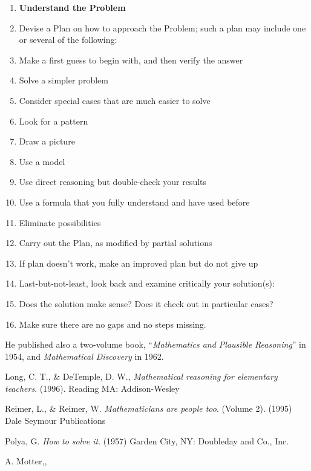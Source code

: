 \documentclass[12pt]{article}
\theoremstyle{plain}
\theoremstyle{definition}
\numberwithin{equation}{section}
\begin{document}
\begin{enumerate}
\item \textbf{Understand the Problem}
\item Devise a Plan on how to approach the Problem; such a plan may include one or several of the following:
\item Make a first guess to begin with, and then verify the answer
\item Solve a simpler problem
\item Consider special cases that are much easier to solve
\item Look for a pattern
\item Draw a picture
\item Use a model  
\item Use direct reasoning but double-check your results
\item Use a formula that you fully understand and have used before
\item Eliminate possibilities
\item Carry out the Plan, as modified by partial solutions
\item If plan doesn't work, make an improved plan but do not give up
\item Last-but-not-least, look back and examine critically your solution(s):
\item Does the solution make sense? Does it check out in particular cases?
\item Make sure there are no gaps and no steps missing.
\end{enumerate}

He published also a two-volume book, ``{\em Mathematics and Plausible Reasoning}'' in 1954, and 
{\em Mathematical Discovery} in 1962.


\begin{thebibliography}{9}
Long, C. T., \& DeTemple, D. W., {\em Mathematical reasoning for elementary teachers}. (1996). Reading MA: Addison-Wesley 

\bibitem{}
Reimer, L., \& Reimer, W. {\em Mathematicians are people too}. (Volume 2). (1995) Dale Seymour Publications 

Polya, G. {\em How to solve it}. (1957) Garden City, NY: Doubleday and Co., Inc.

A. Motter,, 


\end{thebibliography}
\end{document}
